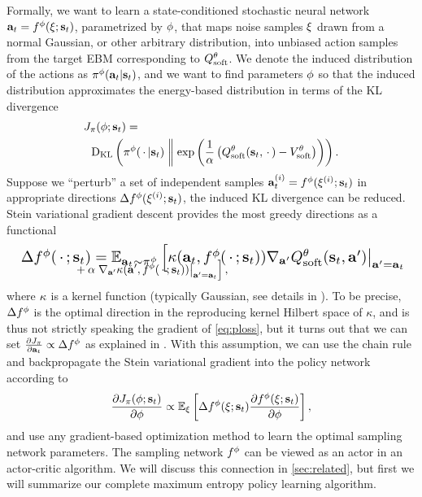 \documentclass{article}
\begin{document}
Formally, we want to learn a state-conditioned stochastic neural network ${\mathbf{a}_t} = f^{\phi}(\mathbf{\xi}; {\mathbf{s}_t})$, parametrized by ${\phi}$, that maps noise samples $\mathbf{\xi}$ drawn from a normal Gaussian, or other arbitrary distribution, into unbiased action samples from the target EBM corresponding to $Q_\mathrm{soft}^{\theta}$.
We denote the induced distribution of the actions as $\pi^{\phi}({\mathbf{a}_t} | {\mathbf{s}_t})$, and we want to find parameters ${\phi}$ so that the induced distribution approximates the energy-based distribution in terms of the KL divergence
\vspace{-2mm}
\begin{align}
&\ploss(\pparams; \st) = \label{eq:ploss}\\
&\ \ \kl{\policy^\pparams({\sdots|\st})}{\exp\left(\frac{1}{\alpha}\left(\Qsoftparams(\st, \sdots) - \Vsoftparams\right)\right)}\notag.
\end{align}
Suppose we ``perturb'' a set of independent samples ${\mathbf{a}_t^{(i)}} = f^{\phi}(\mathbf{\xi}^{(i)}; {\mathbf{s}_t})$ in appropriate directions $\Delta f^{\phi}(\mathbf{\xi}^{(i)}; {\mathbf{s}_t})$, the induced KL divergence can be reduced. Stein variational gradient descent \cite{liu2016stein} provides the most greedy directions as a functional
\begin{align}
&\resizebox{1.0\hsize}{!}{
$\Delta f^\pparams(\sdots; \st) =\label{eq:stein_gradient}
\mathbb{E}_{\at\sim\policy^\pparams}\left[\kernel(\at, f^\pparams(\sdots; \st))\nabla_{\action'} \Qsoftparams(\st, \action')\big|_{\action' = \at} \right.$} \\[-5mm] 
&\hspace{18mm} + \alpha\left.\nabla_{\action'}\kernel(\action', f^\pparams(\sdots; \st))\big|_{\action' = \at}\right],\notag
\end{align}
where $\kappa$ is a kernel function (typically Gaussian, see details in ). 
To be precise, $\Delta f^{\phi}$ is the optimal direction in the reproducing kernel Hilbert space of $\kappa$, and is thus not strictly speaking the gradient of \autoref{eq:ploss}, but it turns out that we can set $\frac{\partial J_\pi}{\partial{\mathbf{a}_t}} \propto \Delta f^{\phi}$ as explained in \cite{wang2016learning}.
With this assumption, we can use the chain rule and backpropagate the Stein variational gradient into the policy network according to
\begin{align}
\frac{\partial J_\pi({\phi}; {\mathbf{s}_t})}{\partial {\phi}} \propto \operatorname{\mathbb{E}}_{\xi}\left[\Delta f^{\phi}(\xi;{\mathbf{s}_t})\frac{\partial f^{\phi}(\xi; {\mathbf{s}_t})}{\partial {\phi}}\right],
\label{eq:actor_gradient}
\end{align}
and use any gradient-based optimization method to learn the optimal sampling network parameters. 
The sampling network $f^{\phi}$ can be viewed as an actor in an actor-critic algorithm. We will discuss this connection in \autoref{sec:related}, but first we will summarize our complete maximum entropy policy learning algorithm.
\end{document}
